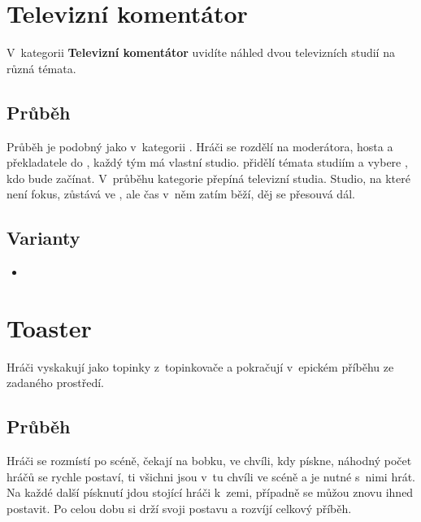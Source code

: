  
 
 
 
\needspace{5cm} \section{Televizní komentátor} \label{televizní komentátor}  
 
V~kategorii \textbf{Televizní komentátor} uvidíte náhled dvou televizních studií na různá témata. 
 
\subsection{ Průběh } Průběh je podobný jako v~kategorii . Hráči se rozdělí na moderátora, hosta a překladatele do , každý tým má vlastní studio.  přidělí témata studiím a vybere , kdo bude začínat. V~průběhu kategorie  přepíná televizní studia. 
Studio, na které není fokus, zůstává ve , ale čas v~něm zatím běží, děj se přesouvá dál. 
 
\subsection{ Varianty } \begin{itemize}
\item  {}
\end{itemize}
 
 
 
 
\needspace{5cm} \section{Toaster} \label{toaster}  
 
Hráči vyskakují jako topinky z~topinkovače a pokračují v~epickém příběhu ze zadaného prostředí. 
 
\subsection{ Průběh } Hráči se rozmístí po scéně, čekají na bobku, ve chvíli, kdy  pískne, náhodný počet hráčů se rychle postaví, ti všichni jsou v~tu chvíli ve scéně a je nutné s~nimi hrát.  Na každé další písknutí jdou stojící hráči k~zemi, případně se můžou znovu ihned postavit. Po celou dobu si drží svoji postavu   a rozvíjí celkový příběh. 
 
